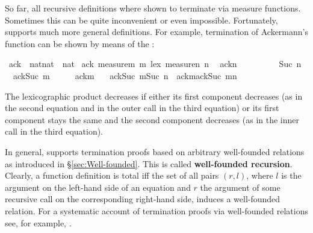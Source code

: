 %
\begin{isabellebody}%
\def\isabellecontext{WFrec}%
%
\begin{isamarkuptext}%
\noindent
So far, all recursive definitions where shown to terminate via measure
functions. Sometimes this can be quite inconvenient or even
impossible. Fortunately,  supports much more
general definitions. For example, termination of Ackermann's function
can be shown by means of the  :%
\end{isamarkuptext}%
\ ack\ {\isacharcolon}{\isacharcolon}\ {\isachardoublequote}nat{\isasymtimes}nat\ {\isasymRightarrow}\ nat{\isachardoublequote}\isanewline
{}\ ack\ {\isachardoublequote}measure{\isacharparenleft}{\isasymlambda}m{\isachardot}\ m{\isacharparenright}\ {\isacharless}{\isacharasterisk}lex{\isacharasterisk}{\isachargreater}\ measure{\isacharparenleft}{\isasymlambda}n{\isachardot}\ n{\isacharparenright}{\isachardoublequote}\isanewline
\ \ {\isachardoublequote}ack{\isacharparenleft}{}{\isacharcomma}n{\isacharparenright}\ \ \ \ \ \ \ \ \ {\isacharequal}\ Suc\ n{\isachardoublequote}\isanewline
\ \ {\isachardoublequote}ack{\isacharparenleft}Suc\ m{\isacharcomma}{}{\isacharparenright}\ \ \ \ \ {\isacharequal}\ ack{\isacharparenleft}m{\isacharcomma}\ {}{\isacharparenright}{\isachardoublequote}\isanewline
\ \ {\isachardoublequote}ack{\isacharparenleft}Suc\ m{\isacharcomma}Suc\ n{\isacharparenright}\ {\isacharequal}\ ack{\isacharparenleft}m{\isacharcomma}ack{\isacharparenleft}Suc\ m{\isacharcomma}n{\isacharparenright}{\isacharparenright}{\isachardoublequote}%
\begin{isamarkuptext}%
\noindent
The lexicographic product decreases if either its first component
decreases (as in the second equation and in the outer call in the
third equation) or its first component stays the same and the second
component decreases (as in the inner call in the third equation).

In general,  supports termination proofs based on
arbitrary well-founded relations as introduced in \S\ref{sec:Well-founded}.
This is called \textbf{well-founded
recursion}. Clearly, a function definition
is total iff the set of all pairs $(r,l)$, where $l$ is the argument on the
left-hand side of an equation and $r$ the argument of some recursive call on
the corresponding right-hand side, induces a well-founded relation.  For a
systematic account of termination proofs via well-founded relations see, for
example, \cite{Baader-Nipkow}.


\end{isamarkuptext}
\end{isabellebody}

